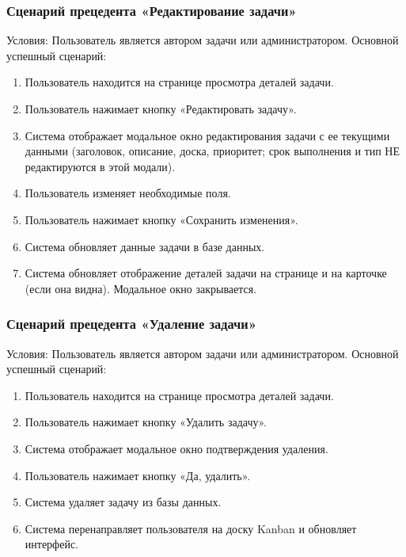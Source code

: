 \subsubsection{Сценарий прецедента «Редактирование задачи»}
Условия: Пользователь является автором задачи или администратором.
Основной успешный сценарий:
\begin{enumerate}
	\item Пользователь находится на странице просмотра деталей задачи.
	\item Пользователь нажимает кнопку «Редактировать задачу».
	\item Система отображает модальное окно редактирования задачи с ее текущими данными (заголовок, описание, доска, приоритет; срок выполнения и тип НЕ редактируются в этой модали).
	\item Пользователь изменяет необходимые поля.
	\item Пользователь нажимает кнопку «Сохранить изменения».
	\item Система обновляет данные задачи в базе данных.
	\item Система обновляет отображение деталей задачи на странице и на карточке (если она видна). Модальное окно закрывается.
\end{enumerate}

\subsubsection{Сценарий прецедента «Удаление задачи»}
Условия: Пользователь является автором задачи или администратором.
Основной успешный сценарий:
\begin{enumerate}
	\item Пользователь находится на странице просмотра деталей задачи.
	\item Пользователь нажимает кнопку «Удалить задачу».
	\item Система отображает модальное окно подтверждения удаления.
	\item Пользователь нажимает кнопку «Да, удалить».
	\item Система удаляет задачу из базы данных.
	\item Система перенаправляет пользователя на доску Kanban и обновляет интерфейс.
\end{enumerate}

